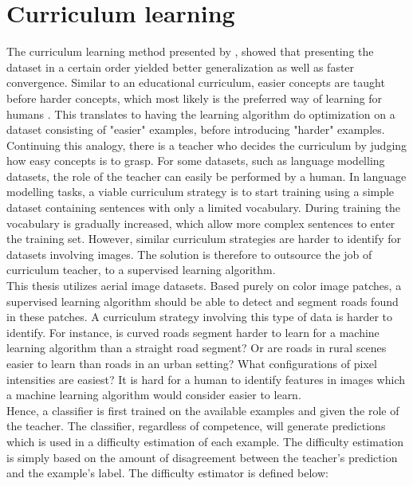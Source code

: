\section{Curriculum learning}
\label{sec:curriculum_Learning}
The curriculum learning method presented by \cite{Bengio_curriculumlearning}, showed that presenting the dataset in a certain order yielded better generalization as well as faster convergence. Similar to an educational curriculum, easier concepts are taught before harder concepts, which most likely is the preferred way of learning for humans \citep{Khan_human_teach}. This translates to having the learning algorithm do optimization on a dataset consisting of "easier" examples, before introducing "harder" examples. Continuing this analogy, there is a teacher who decides the curriculum by judging how easy concepts is to grasp. For some datasets, such as language modelling datasets, the role of the teacher can easily be performed by a human. In language modelling tasks, a viable curriculum strategy is to start training using a simple dataset containing sentences with only a limited vocabulary. During training the vocabulary is gradually increased, which allow more complex sentences to enter the training set. However, similar curriculum strategies are harder to identify for datasets involving images. The solution is therefore to outsource the job of curriculum teacher, to a supervised learning algorithm.  \\

This thesis utilizes aerial image datasets. Based purely on color image patches, a supervised learning algorithm should be able to detect and segment roads found in these patches. A curriculum strategy involving this type of data is harder to identify. For instance, is curved roads segment harder to learn for a machine learning algorithm than a straight road segment? Or are roads in rural scenes easier to learn than roads in an urban setting? What configurations of pixel intensities are easiest? It is hard for a human to identify features in images which a machine learning algorithm would consider easier to learn. \\


Hence, a classifier is first trained on the available examples and given the role of the teacher. The classifier, regardless of competence, will generate predictions which is used in a difficulty estimation of each example. The difficulty estimation is simply based on the amount of disagreement between the teacher's prediction and the example's label. The difficulty estimator is defined below:  \\

